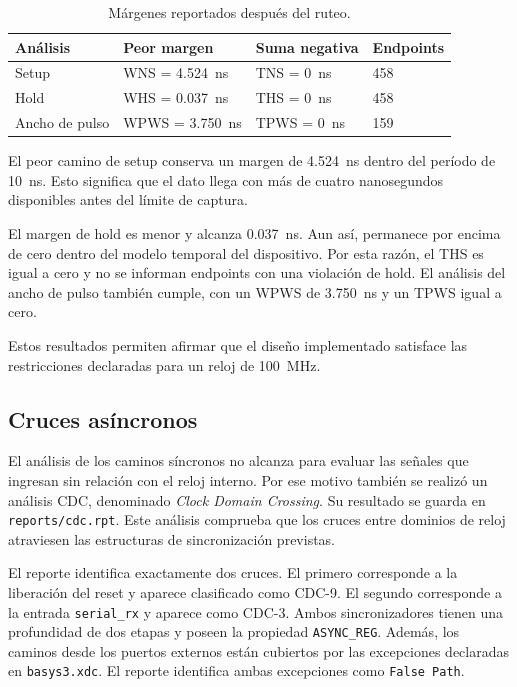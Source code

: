 \begin{table}[H]
  \centering
  \begin{tabularx}{0.92\textwidth}{ZZZZ}
    \toprule
    \textbf{Análisis} & \textbf{Peor margen} & \textbf{Suma negativa} &
    \textbf{Endpoints} \\
    \midrule
    Setup & WNS = \SI{4.524}{\nano\second} & TNS = \SI{0}{\nano\second} & 458 \\
    Hold & WHS = \SI{0.037}{\nano\second} & THS = \SI{0}{\nano\second} & 458 \\
    Ancho de pulso & WPWS = \SI{3.750}{\nano\second} &
    TPWS = \SI{0}{\nano\second} & 159 \\
    \bottomrule
  \end{tabularx}
  \caption{Márgenes reportados después del ruteo.}%
  \label{tab:timing}
\end{table}

El peor camino de setup conserva un margen de
\SI{4.524}{\nano\second} dentro del período de \SI{10}{\nano\second}.
Esto significa que el dato llega con más de cuatro nanosegundos
disponibles antes del límite de captura.

El margen de hold es menor y alcanza \SI{0.037}{\nano\second}. Aun
así, permanece por encima de cero dentro del modelo temporal del
dispositivo. Por esta razón, el THS es igual a cero y no se informan
endpoints con una violación de hold. El análisis del ancho de pulso
también cumple, con un WPWS de \SI{3.750}{\nano\second} y un TPWS igual a cero.

Estos resultados permiten afirmar que el diseño implementado
satisface las restricciones declaradas para un reloj de \SI{100}{\mega\hertz}.

\subsection{Cruces asíncronos}

El análisis de los caminos síncronos no alcanza para evaluar las
señales que ingresan sin relación con el reloj interno. Por ese
motivo también se realizó un análisis CDC, denominado \emph{Clock
Domain Crossing}. Su resultado se guarda en \texttt{reports/cdc.rpt}.
Este análisis comprueba que los cruces entre dominios de reloj
atraviesen las estructuras de sincronización previstas.

El reporte identifica exactamente dos cruces. El primero corresponde
a la liberación del reset y aparece clasificado como CDC-9. El
segundo corresponde a la entrada \texttt{serial\_rx} y aparece como
CDC-3. Ambos sincronizadores tienen una profundidad de dos etapas y
poseen la propiedad \texttt{ASYNC\_REG}. Además, los caminos desde
los puertos externos están cubiertos por las excepciones declaradas
en \texttt{basys3.xdc}. El reporte identifica ambas excepciones como
\texttt{False Path}.

